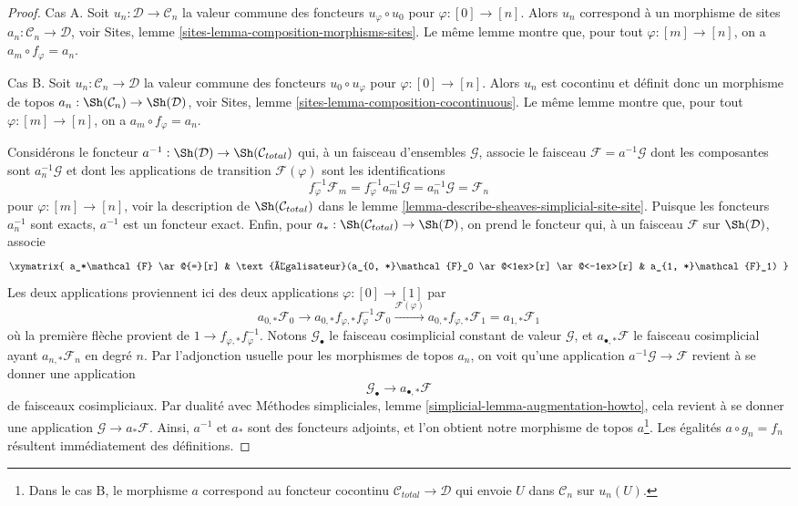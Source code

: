 \begin{proof}
Cas A. Soit $u_n : \mathcal{D} \to \mathcal{C}_n$ la valeur commune
des foncteurs $u_\varphi \circ u_0$ pour $\varphi : [0] \to [n]$.
Alors $u_n$ correspond à un morphisme de sites
$a_n : \mathcal{C}_n \to \mathcal{D}$, voir
Sites, lemme \ref{sites-lemma-composition-morphisms-sites}.
Le même lemme montre que, pour tout $\varphi : [m] \to [n]$, on a
$a_m \circ f_\varphi = a_n$.

\medskip\noindent
Cas B. Soit $u_n : \mathcal{C}_n \to \mathcal{D}$ la valeur commune
des foncteurs $u_0 \circ u_\varphi$ pour $\varphi : [0] \to [n]$.
Alors $u_n$ est cocontinu et définit donc un morphisme de topos
$a_n : \Sh(\mathcal{C}_n) \to \Sh(\mathcal{D)}$, voir
Sites, lemme \ref{sites-lemma-composition-cocontinuous}.
Le même lemme montre que, pour tout $\varphi : [m] \to [n]$, on a
$a_m \circ f_\varphi = a_n$.

\medskip\noindent
Considérons le foncteur $a^{-1} : \Sh(\mathcal{D}) \to \Sh(\mathcal{C}_{total})$
qui, à un faisceau d'ensembles $\mathcal{G}$, associe le faisceau
$\mathcal{F} = a^{-1}\mathcal{G}$ dont les composantes sont $a_n^{-1}\mathcal{G}$
et dont les applications de transition $\mathcal{F}(\varphi)$ sont les identifications
$$
f_\varphi^{-1}\mathcal{F}_m =
f_\varphi^{-1} a_m^{-1}\mathcal{G} =
a_n^{-1}\mathcal{G} =
\mathcal{F}_n
$$
pour $\varphi : [m] \to [n]$, voir la description de
$\Sh(\mathcal{C}_{total})$ dans le
lemme \ref{lemma-describe-sheaves-simplicial-site-site}.
Puisque les foncteurs $a_n^{-1}$ sont exacts, $a^{-1}$ est un foncteur exact.
Enfin, pour $a_* : \Sh(\mathcal{C}_{total}) \to \Sh(\mathcal{D})$,
on prend le foncteur qui, à un faisceau $\mathcal{F}$ sur $\Sh(\mathcal{D})$,
associe
$$
\xymatrix{
a_*\mathcal{F} \ar@{=}[r] &
\text{Égalisateur}(a_{0, *}\mathcal{F}_0
\ar@<1ex>[r] \ar@<-1ex>[r] &
a_{1, *}\mathcal{F}_1)
}
$$
Les deux applications proviennent ici des deux applications $\varphi : [0] \to [1]$
par
$$
a_{0, *}\mathcal{F}_0 \to
a_{0, *}f_{\varphi, *} f_\varphi^{-1}\mathcal{F}_0
\xrightarrow{\mathcal{F}(\varphi)}
a_{0, *}f_{\varphi, *} \mathcal{F}_1 = a_{1, *}\mathcal{F}_1
$$
où la première flèche provient de $1 \to f_{\varphi, *} f_\varphi^{-1}$.
Notons $\mathcal{G}_\bullet$ le faisceau cosimplicial constant
de valeur $\mathcal{G}$, et $a_{\bullet, *}\mathcal{F}$
le faisceau cosimplicial ayant $a_{n, *}\mathcal{F}_n$ en degré $n$.
Par l'adjonction usuelle pour les morphismes de topos $a_n$, on voit qu'une
application $a^{-1}\mathcal{G} \to \mathcal{F}$
revient à se donner une application
$$
\mathcal{G}_\bullet \longrightarrow a_{\bullet, *}\mathcal{F}
$$
de faisceaux cosimpliciaux.
Par dualité avec Méthodes simpliciales, lemme \ref{simplicial-lemma-augmentation-howto},
cela revient à se donner une application $\mathcal{G} \to a_*\mathcal{F}$.
Ainsi, $a^{-1}$ et $a_*$ sont des foncteurs adjoints, et l'on obtient
notre morphisme de topos $a$\footnote{Dans le cas B, le morphisme $a$
correspond au foncteur cocontinu
$\mathcal{C}_{total} \to \mathcal{D}$ qui envoie
$U$ dans $\mathcal{C}_n$ sur $u_n(U)$.}. Les égalités
$a \circ g_n = f_n$ résultent immédiatement des définitions.
\end{proof}



